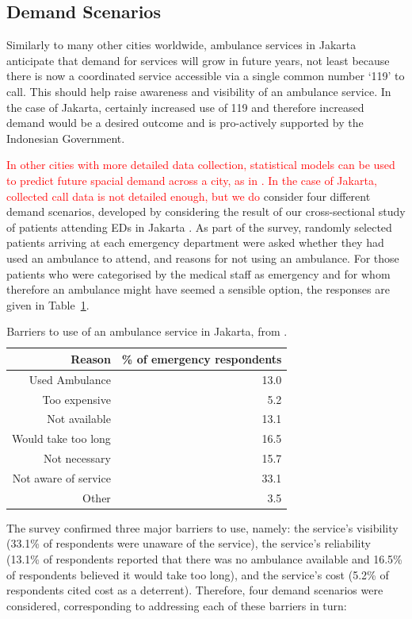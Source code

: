 \documentclass[numbers,webpdf,imaman]{ima-authoring-template}%
\begin{document}
\subsection{Demand Scenarios}\label{sec:demand_scenarios}
Similarly to many other cities worldwide, ambulance services in Jakarta
anticipate that demand for services will grow in future years, not least because
there is now a coordinated service accessible via a single common number `119'
to call. This should help raise awareness and visibility of an ambulance
service. In the case of Jakarta, certainly increased use of 119 and therefore
increased demand would be a desired outcome and is pro-actively supported
by the Indonesian Government.

\textcolor{red}{In other cities with more detailed data collection, statistical
models can be used to predict future spacial demand across a city, as in
\cite{nicoletta2022bayesian}. In the case of Jakarta, collected call data is
not detailed enough, but we do}
consider four different demand scenarios, developed by considering the
result of our cross-sectional study of patients attending EDs in Jakarta
\citep{BriceSyaribahNoor2022Esui}. As part of the survey, randomly selected
patients arriving at each emergency department were asked whether they had
used an ambulance to attend, and reasons for not using an ambulance. For those
patients who were categorised by the medical staff as emergency and for whom
therefore an ambulance might have seemed a sensible option, the responses are
given in Table~\ref{table:survey_results}.

\begin{table}
\centering
\begin{tabular}{rr}
\toprule
Reason & \% of emergency respondents \\
\midrule
Used Ambulance & 13.0\\
Too expensive & 5.2  \\
Not available  & 13.1 \\
Would take too long & 16.5 \\
Not necessary & 15.7  \\
Not aware of service & 33.1\\
Other &3.5 \\
\bottomrule
\end{tabular}
\caption{Barriers to use of an ambulance service in Jakarta, from
         \citet{BriceSyaribahNoor2022Esui}.}
\label{table:survey_results}
\end{table}

The survey confirmed three major barriers to use, namely: the service's
visibility (33.1\% of respondents were unaware of the service), the service's
reliability (13.1\% of respondents reported that there was no ambulance
available and 16.5\% of respondents believed it would take too long), and the
service's cost (5.2\% of respondents cited cost as a deterrent). Therefore,
four demand scenarios were considered, corresponding to addressing each of
these barriers in turn:
\end{document}
